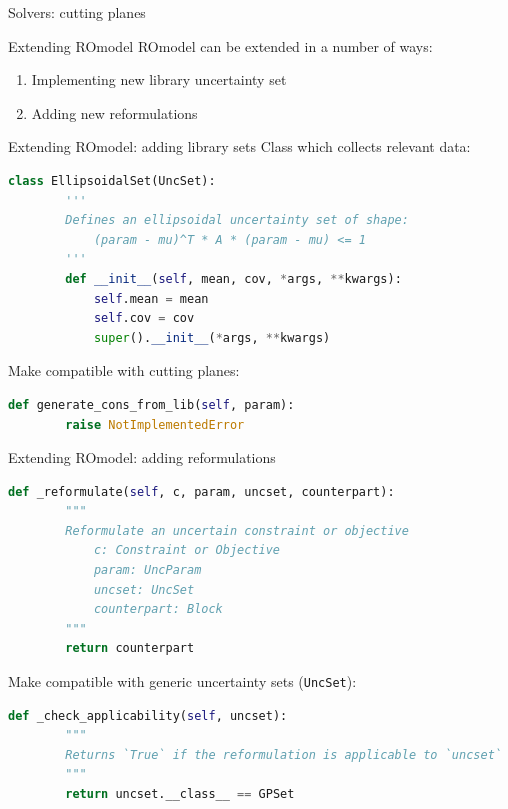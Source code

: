\documentclass[slides,aspectratio=169]{beamer}
\begin{document}
\begin{frame}{Solvers: cutting planes}
    \centering
    
\end{frame}


\begin{frame}{Extending ROmodel}
    ROmodel can be extended in a number of ways:
    \begin{enumerate}
        \item Implementing new library uncertainty set
        \item Adding new reformulations
    \end{enumerate}

\end{frame}

\begin{frame}[fragile]{Extending ROmodel: adding library sets}
    Class which collects relevant data:
\begin{lstlisting}[language=Python]
    class EllipsoidalSet(UncSet):
        '''
        Defines an ellipsoidal uncertainty set of shape:
            (param - mu)^T * A * (param - mu) <= 1
        '''
        def __init__(self, mean, cov, *args, **kwargs):
            self.mean = mean
            self.cov = cov
            super().__init__(*args, **kwargs)
\end{lstlisting}
    Make compatible with cutting planes:
\begin{lstlisting}[language=Python]
    def generate_cons_from_lib(self, param):
        raise NotImplementedError
\end{lstlisting}
\end{frame}

\begin{frame}[fragile]{Extending ROmodel: adding reformulations}
\begin{lstlisting}[language=Python]
    def _reformulate(self, c, param, uncset, counterpart):
        """
        Reformulate an uncertain constraint or objective
            c: Constraint or Objective
            param: UncParam
            uncset: UncSet
            counterpart: Block
        """
        return counterpart
\end{lstlisting}
Make compatible with generic uncertainty sets (\lstinline{UncSet}): \begin{lstlisting}[language=Python]
    def _check_applicability(self, uncset):
        """
        Returns `True` if the reformulation is applicable to `uncset`
        """
        return uncset.__class__ == GPSet
\end{lstlisting}
\end{frame}
\end{document}
